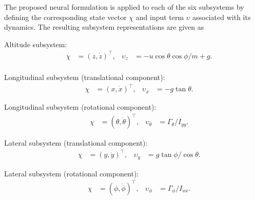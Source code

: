 \documentclass[conference]{IEEEtran}
\begin{document}
The proposed neural formulation is applied to each of the six subsystems by defining the corresponding state vector $\chi$ and input term $\upsilon$ associated with its dynamics. The resulting subsystem representations are given as

Altitude subsystem:
\begin{equation*}
\begin{aligned}
& & \chi&=(z,\dot z)^\top, & \upsilon_z&=-{u}\cos\theta\cos\phi/m +g.\\
\end{aligned}
\end{equation*}

Longitudinal subsystem (translational component):
\begin{equation*}
\begin{aligned}
& & \chi&=(x,\dot x)^\top, & \upsilon_x&=-g\tan\theta.
\end{aligned}
\end{equation*}

Longitudinal subsystem (rotational component):
\begin{equation*}
\begin{aligned}
& & \chi&=(\theta,\dot\theta)^\top, & \upsilon_\theta&=\Gamma_\theta/I_{yy}.
\end{aligned}
\end{equation*}

Lateral subsystem (translational component):
\begin{equation*}
\begin{aligned}
& & \chi&=(y,\dot y)^\top, & \upsilon_y&=g\tan\phi/\cos\theta.
\end{aligned}
\end{equation*}

Lateral subsystem (rotational component):
\begin{equation*}
\begin{aligned}
& & \chi&=(\phi,\dot\phi)^\top, & \upsilon_\phi&=\Gamma_\phi/I_{xx}.
\end{aligned}
\end{equation*}
\end{document}
